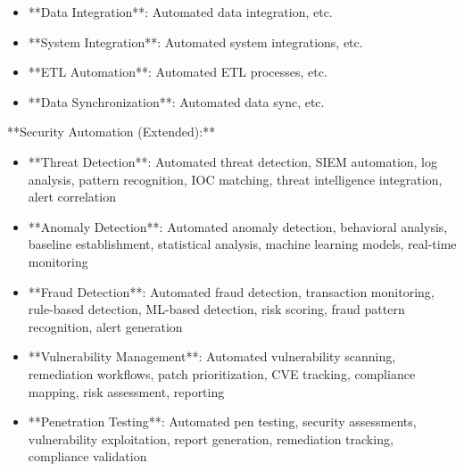 \documentclass[11pt,a4paper]{article}
\begin{document}
\begin{itemize}
\item **Data Integration**: Automated data integration, etc.
\end{itemize}

\begin{itemize}
\item **System Integration**: Automated system integrations, etc.
\end{itemize}

\begin{itemize}
\item **ETL Automation**: Automated ETL processes, etc.
\end{itemize}

\begin{itemize}
\item **Data Synchronization**: Automated data sync, etc.
\end{itemize}

**Security Automation (Extended):**

\begin{itemize}
\item **Threat Detection**: Automated threat detection, SIEM automation, log analysis, pattern recognition, IOC matching, threat intelligence integration, alert correlation
\end{itemize}

\begin{itemize}
\item **Anomaly Detection**: Automated anomaly detection, behavioral analysis, baseline establishment, statistical analysis, machine learning models, real-time monitoring
\end{itemize}

\begin{itemize}
\item **Fraud Detection**: Automated fraud detection, transaction monitoring, rule-based detection, ML-based detection, risk scoring, fraud pattern recognition, alert generation
\end{itemize}

\begin{itemize}
\item **Vulnerability Management**: Automated vulnerability scanning, remediation workflows, patch prioritization, CVE tracking, compliance mapping, risk assessment, reporting
\end{itemize}

\begin{itemize}
\item **Penetration Testing**: Automated pen testing, security assessments, vulnerability exploitation, report generation, remediation tracking, compliance validation
\end{itemize}
\end{document}
